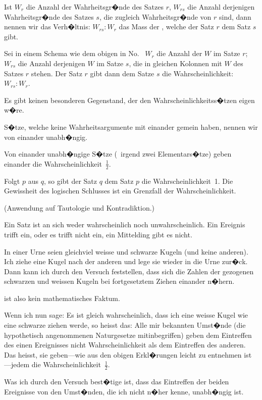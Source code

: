{Ist $W_{r}$ die Anzahl der Wahrheitsgr�nde des
Satzes \glqq{}$r$\grqq{}, $W_{rs}$ die Anzahl derjenigen Wahrheitsgr�nde
des Satzes \glqq{}$s$\grqq{}, die zugleich Wahrheitsgr�nde
von \glqq{}$r$\grqq{} sind, dann nennen wir das Verh�ltnis: $W_{rs} :
W_{r}$ das Mass der , welche
der Satz \glqq{}$r$\grqq{} dem Satz \glqq{}$s$\grqq{} gibt.}


{Sei in einem Schema wie dem obigen in No.~
$W_{r}$ die Anzahl der \glqq{}$W$\grqq{} im Satze $r$; $W_{rs}$ die
Anzahl derjenigen \glqq{}$W$\grqq{} im Satze $s$, die in gleichen
Kolonnen mit \glqq{}$W$\grqq{} des Satzes $r$ stehen. Der Satz
$r$ gibt dann dem Satze $s$ die Wahrscheinlichkeit:
$W_{rs} : W_{r}$.}


{Es gibt keinen besonderen Gegenstand, der den
Wahrscheinlichkeitss�tzen eigen w�re.}


{S�tze, welche keine Wahrheitsargumente mit
einander gemein haben, nennen wir von einander
unabh�ngig.

Von einander unabh�ngige S�tze (\zumBeispiel\ irgend
zwei Elementars�tze) geben einander die Wahrscheinlichkeit~$\frac{1}{2}$.

Folgt $p$ aus $q$, so gibt der Satz \glqq{}$q$\grqq{} dem Satz
\glqq{}$p$\grqq{} die Wahrscheinlichkeit~1. Die Gewissheit
des logischen Schlusses ist ein Grenzfall der
Wahrscheinlichkeit.

(Anwendung auf Tautologie und Kontradiktion.)}


{Ein Satz ist an sich weder wahrscheinlich noch
unwahrscheinlich. Ein Ereignis trifft ein, oder
es trifft nicht ein, ein Mittelding gibt es nicht.}


{In einer Urne seien gleichviel weisse und
schwarze Kugeln (und keine anderen). Ich ziehe
eine Kugel nach der anderen und lege sie wieder
in die Urne zur�ck. Dann kann ich durch den
Versuch feststellen, dass sich die Zahlen der
gezogenen schwarzen und weissen Kugeln bei
fortgesetztem Ziehen einander n�hern.

 ist also kein mathematisches Faktum.

Wenn ich nun sage: Es ist gleich wahrscheinlich,
dass ich eine weisse Kugel wie eine
schwarze ziehen werde, so heisst das: Alle mir
bekannten Umst�nde (die hypothetisch angenommenen
Naturgesetze mitinbegriffen) geben dem
Eintreffen des einen Ereignisses nicht 
Wahrscheinlichkeit als dem Eintreffen des anderen.
Das heisst, sie geben---wie aus den obigen Erkl�rungen
leicht zu entnehmen ist---jedem die
Wahrscheinlichkeit~$\frac{1}{2}$.

Was ich durch den Versuch best�tige ist, dass
das Eintreffen der beiden Ereignisse von den Umst�nden,
die ich nicht n�her kenne, unabh�ngig ist.}


